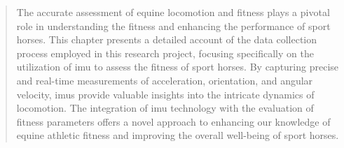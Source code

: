 \begin{quote}

The accurate assessment of equine locomotion and fitness plays a pivotal role in understanding the fitness and enhancing the performance of sport horses. This chapter presents a detailed account of the data collection process employed in this research project, focusing specifically on the utilization of \gls{imu} to assess the fitness of sport horses. By capturing precise and real-time measurements of acceleration, orientation, and angular velocity, \gls{imu}s provide valuable insights into the intricate dynamics of locomotion. The integration of \gls{imu} technology with the evaluation of fitness parameters offers a novel approach to enhancing our knowledge of equine athletic fitness and improving the overall well-being of sport horses.

\end{quote}